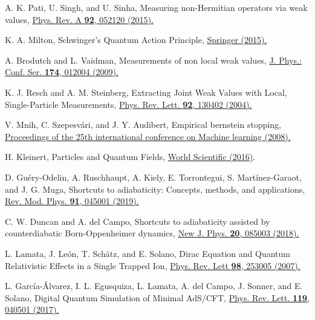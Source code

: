 \documentclass[twocolumn,pra,aps,superscriptaddress]{revtex4-2}
\begin{document}
\begin{thebibliography}{99}
 A. K. Pati, U. Singh, and U. Sinha, Measuring non-Hermitian operators via weak values, \href{https://journals.aps.org/pra/abstract/10.1103/PhysRevA.92.052120}{Phys. Rev. A \textbf{92}, 052120 (2015).}

 K. A. Milton, Schwinger's Quantum Action Principle, \href{https://arxiv.org/pdf/1503.08091.pdf;}{Springer (2015).}

 A. Brodutch and L. Vaidman, Measurements of non local weak values, \href{https://iopscience.iop.org/article/10.1088/1742-6596/174/1/012004}{J. Phys.: Conf. Ser. \textbf{174}, 012004 (2009).}

 K. J. Resch and A. M. Steinberg, Extracting Joint Weak Values with Local, Single-Particle Measurements, \href{https://journals.aps.org/prl/abstract/10.1103/PhysRevLett.92.130402}{Phys. Rev. Lett. \textbf{92}, 130402 (2004).}


 V. Mnih, C. Szepesv\'ari, and J. Y. Audibert, Empirical bernstein stopping, \href{10.1145/1390156.1390241}{Proceedings of the 25th international conference on Machine learning (2008).}

 H. Kleinert, Particles and Quantum Fields, \href{https://doi.org/10.1142/9915}{World Scientific (2016)}.

 D. Gu\'ery-Odelin, A. Ruschhaupt, A. Kiely, E. Torrontegui, S. Mart\'inez-Garaot, and J. G. Muga, 
Shortcuts to adiabaticity: Concepts, methods, and applications, \href{https://link.aps.org/doi/10.1103/RevModPhys.91.045001}{Rev. Mod. Phys. \textbf{91}, 045001 (2019).}

 C. W. Duncan and A. del Campo, Shortcuts to adiabaticity assisted by counterdiabatic Born-Oppenheimer dynamics, \href{https://iopscience.iop.org/article/10.1088/1367-2630/aad437}{New J. Phys. \textbf{20}, 085003 (2018).}

 L. Lamata, J. Le\'on, T. Sch\"atz, and E. Solano, Dirac Equation and Quantum Relativistic Effects in a Single Trapped Ion, \href{https://journals.aps.org/prl/abstract/10.1103/PhysRevLett.98.253005}{Phys. Rev. Lett \textbf{98}, 253005 (2007).}

 L. Garc\'ia-\'Alvarez, I. L. Egusquiza, L. Lamata, A. del Campo, J. Sonner, and E. Solano, Digital Quantum Simulation of Minimal AdS/CFT, \href{https://journals.aps.org/prl/abstract/10.1103/PhysRevLett.119.040501}{Phys. Rev. Lett. \textbf{119}, 040501 (2017).}


\end{thebibliography}
\end{document}
